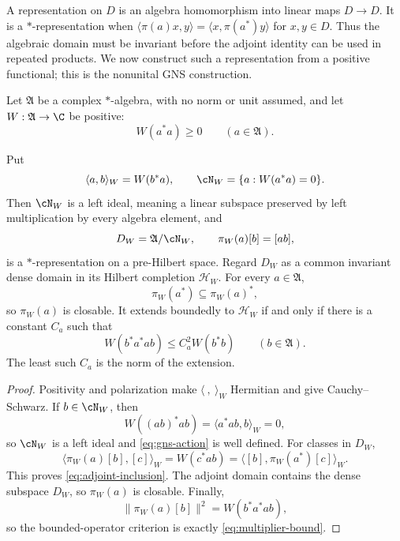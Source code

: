 A representation on $D$ is an algebra homomorphism into linear maps
$D\to D$.  It is a $*$-representation when
$\langle\pi(a)x,y\rangle=\langle x,\pi(a^*)y\rangle$ for $x,y\in D$.
Thus the algebraic domain must be invariant before the adjoint identity
can be used in repeated products.  We now construct such a representation
from a positive functional; this is the nonunital GNS construction.

Let $\mathfrak A$ be a complex $*$-algebra, with no norm or unit assumed,
and let $W:\mathfrak A\to\C$ be positive:
\[
 W(a^*a)\geq0\qquad(a\in\mathfrak A).
\]

\begin{theorem}
\label{thm:gns}
Put
\[
 \langle a,b\rangle_W=W(b^*a),
 \qquad
 \cN_W=\{a:W(a^*a)=0\}.
\]
Then $\cN_W$ is a left ideal, meaning a linear subspace preserved by
left multiplication by every algebra element, and
\begin{equation}
 D_W=\mathfrak A/\cN_W,
 \qquad
 \pi_W(a)[b]=[ab],
 \label{eq:gns-action}
\end{equation}
is a $*$-representation on a pre-Hilbert space.  Regard $D_W$ as a
common invariant dense domain in its Hilbert completion $\mathcal H_W$.
For every $a\in\mathfrak A$,
\begin{equation}
 \pi_W(a^*)\subseteq\pi_W(a)^*,
 \label{eq:adjoint-inclusion}
\end{equation}
so $\pi_W(a)$ is closable.  It extends boundedly to $\mathcal H_W$ if
and only if there is a constant $C_a$ such that
\begin{equation}
 W(b^*a^*ab)\leq C_a^2W(b^*b)
 \qquad(b\in\mathfrak A).
 \label{eq:multiplier-bound}
\end{equation}
The least such $C_a$ is the norm of the extension.
\end{theorem}

\begin{proof}
Positivity and polarization make $\langle\ ,\ \rangle_W$ Hermitian and
give Cauchy--Schwarz.  If $b\in\cN_W$, then
\[
 W((ab)^*ab)=\langle a^*ab,b\rangle_W=0,
\]
so $\cN_W$ is a left ideal and \eqref{eq:gns-action} is well defined.
For classes in $D_W$,
\[
 \langle\pi_W(a)[b],[c]\rangle_W
 =W(c^*ab)
 =\langle[b],\pi_W(a^*)[c]\rangle_W.
\]
This proves \eqref{eq:adjoint-inclusion}.  The adjoint domain contains
the dense subspace $D_W$, so $\pi_W(a)$ is closable.  Finally,
\[
 \|\pi_W(a)[b]\|^2=W(b^*a^*ab),
\]
so the bounded-operator criterion is exactly
\eqref{eq:multiplier-bound}.
\end{proof}

